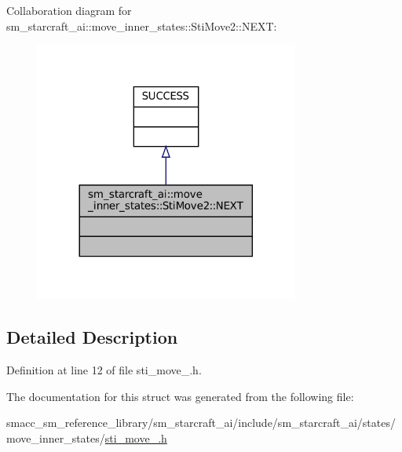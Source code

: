 Collaboration diagram for sm\+\_\+starcraft\+\_\+ai\+:\+:move\+\_\+inner\+\_\+states\+:\+:Sti\+Move2\+:\+:N\+E\+XT\+:
\nopagebreak
\begin{figure}[H]
\begin{center}
\leavevmode
\includegraphics[width=245pt]{structsm__starcraft__ai_1_1move__inner__states_1_1StiMove2_1_1NEXT__coll__graph}
\end{center}
\end{figure}


\subsection{Detailed Description}


Definition at line 12 of file sti\+\_\+move\+\_.\+h.



The documentation for this struct was generated from the following file\+:\begin{DoxyCompactItemize}
\item 
smacc\+\_\+sm\+\_\+reference\+\_\+library/sm\+\_\+starcraft\+\_\+ai/include/sm\+\_\+starcraft\+\_\+ai/states/move\+\_\+inner\+\_\+states/\hyperlink{sti__move__2_8h}{sti\+\_\+move\+\_.\+h}\end{DoxyCompactItemize}

